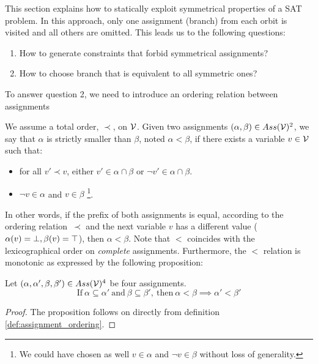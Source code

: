 This section explains how to statically exploit symmetrical properties of a SAT problem.
In this approach, only one assignment (branch) from each orbit is visited and all others are
omitted.%
 This leads us to the following questions:
\begin{enumerate}
	\item How to generate constraints that forbid symmetrical assignments?
	\item How  to choose branch that is equivalent to all symmetric ones?
\end{enumerate}

To answer question 2, we need to introduce an ordering relation between assignments

\begin{definition}
 \label{def:assignment_ordering}
 We assume a total order, $\prec$, on $\mathcal{V}$.  Given two assignments $(\alpha,\beta) \in Ass(\mathcal{V})^2 $, 
 we say that $\alpha$ is strictly smaller than $\beta$, noted $\alpha < \beta$, if there exists a variable $v \in \mathcal{V}$
 such that:
 \begin{itemize}
  \item for all $v' \prec v$, either $v' \in \alpha \cap \beta$ or $\neg v' \in \alpha \cap
  \beta$.
  \item $\neg v \in \alpha$ and $v \in \beta$ \footnote{We could have chosen as well 
   $v \in \alpha$ and $\neg v \in \beta$ without loss of generality.}.
 \end{itemize}
\end{definition}

In other words, if the prefix of both assignments is equal, according to the ordering relation~$\prec$
and the next variable $v$ has a different value ($\alpha(v) = \bot, \beta(v) = \top$), then $\alpha < \beta$.
Note that $<$ coincides with the lexicographical order on \emph{complete}
assignments. 
Furthermore, the $<$ relation is monotonic as expressed by the following proposition:
\begin{proposition}
 \label{prop:monocity_assignments_ordering}
 Let  $(\alpha,\alpha',\beta,\beta') \in Ass(\mathcal{V})^4 $ be four assignments.
 $$\text{If}~\alpha \subseteq \alpha'~\text{and}~\beta \subseteq \beta',~\text{then}~\alpha < \beta \implies \alpha' < \beta'$$
\end{proposition}
\begin{proof}
 The proposition follows on directly from definition \ref{def:assignment_ordering}.
\end{proof}

